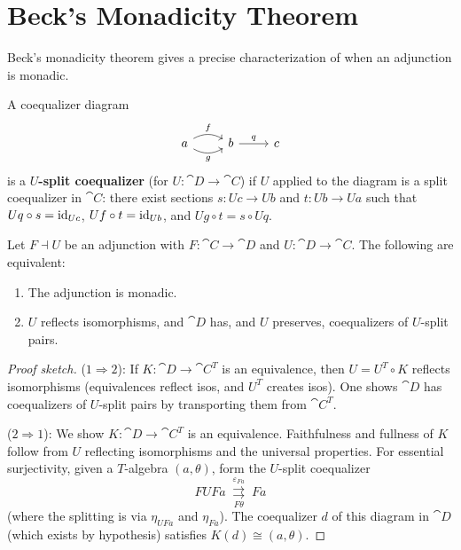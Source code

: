\section{Beck's Monadicity Theorem}

Beck's monadicity theorem gives a precise characterization of when an adjunction is monadic.

\begin{definition}
A coequalizer diagram
\[
  \begin{tikzcd}
    a \arrow[r, bend left, "f"] \arrow[r, bend right, "g"'] & b \arrow[r, "q"] & c
  \end{tikzcd}
\]
is a \textbf{$U$-split coequalizer} (for $U: \cat{D} \to \cat{C}$) if $U$ applied to the diagram is a split coequalizer in $\cat{C}$: there exist sections $s: Uc \to Ub$ and $t: Ub \to Ua$ such that $Uq \circ s = \mathrm{id}_{Uc}$, $Uf \circ t = \mathrm{id}_{Ub}$, and $Ug \circ t = s \circ Uq$.
\end{definition}

\begin{theorem}
\label{thm:beck}
Let $F \dashv U$ be an adjunction with $F: \cat{C} \to \cat{D}$ and $U: \cat{D} \to \cat{C}$. The following are equivalent:
\begin{enumerate}
  \item The adjunction is monadic.
  \item $U$ reflects isomorphisms, and $\cat{D}$ has, and $U$ preserves, coequalizers of $U$-split pairs.
\end{enumerate}
\end{theorem}

\begin{proof}[Proof sketch]
($1 \Rightarrow 2$): If $K: \cat{D} \to \cat{C}^T$ is an equivalence, then $U = U^T \circ K$ reflects isomorphisms (equivalences reflect isos, and $U^T$ creates isos). One shows $\cat{D}$ has coequalizers of $U$-split pairs by transporting them from $\cat{C}^T$.

($2 \Rightarrow 1$): We show $K: \cat{D} \to \cat{C}^T$ is an equivalence. Faithfulness and fullness of $K$ follow from $U$ reflecting isomorphisms and the universal properties. For essential surjectivity, given a $T$-algebra $(a, \theta)$, form the $U$-split coequalizer
\[
  FUFa \;\underset{F\theta}{\overset{\varepsilon_{Fa}}{\rightrightarrows}}\; Fa
\]
(where the splitting is via $\eta_{UFa}$ and $\eta_{Fa}$). The coequalizer $d$ of this diagram in $\cat{D}$ (which exists by hypothesis) satisfies $K(d) \cong (a, \theta)$.
\end{proof}

